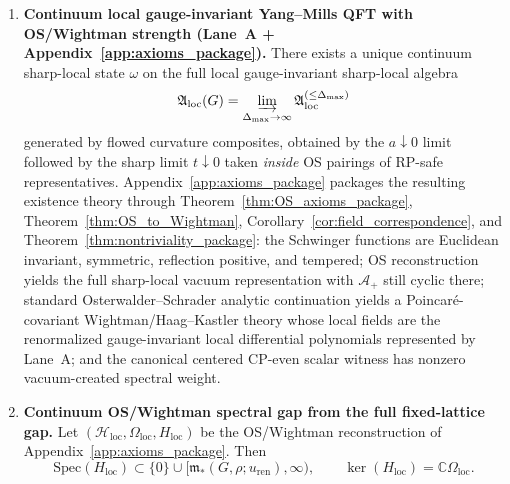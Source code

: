 \begin{theorem}
\begin{enumerate}[label=\textbf{(\Alph*)},leftmargin=2.2em]
\item \textbf{Continuum local gauge-invariant Yang--Mills QFT with OS/Wightman strength (Lane~A + Appendix~\ref{app:axioms_package}).}
There exists a unique continuum sharp-local state $\omega$ on the full local gauge-invariant sharp-local algebra
\[
\mathfrak A_{\mathrm{loc}}(G)=\varinjlim_{\Delta_{\max}\to\infty}\mathfrak A_{\mathrm{loc}}^{(\le \Delta_{\max})}
\]
generated by flowed curvature composites,
obtained by the $a\downarrow0$ limit followed by the sharp limit $t\downarrow0$ taken \emph{inside} OS pairings of RP-safe representatives.
Appendix~\ref{app:axioms_package} packages the resulting existence theory through Theorem~\ref{thm:OS_axioms_package}, Theorem~\ref{thm:OS_to_Wightman}, Corollary~\ref{cor:field_correspondence}, and Theorem~\ref{thm:nontriviality_package}: the Schwinger functions are Euclidean invariant, symmetric, reflection positive, and tempered; OS reconstruction yields the full sharp-local vacuum representation with $\mathcal A_+$ still cyclic there; standard Osterwalder--Schrader analytic continuation yields a Poincar\'e-covariant Wightman/Haag--Kastler theory whose local fields are the renormalized gauge-invariant local differential polynomials represented by Lane~A; and the canonical centered CP-even scalar witness has nonzero vacuum-created spectral weight.

\item \textbf{Continuum OS/Wightman spectral gap from the full fixed-lattice gap.}
Let $(\mathcal H_{\mathrm{loc}},\Omega_{\mathrm{loc}},H_{\mathrm{loc}})$ be the OS/Wightman reconstruction of Appendix~\ref{app:axioms_package}.
Then
\[
\mathrm{Spec}(H_{\mathrm{loc}})\subset\{0\}\cup[\mathfrak m_\ast(G,\rho;u_{\mathrm{ren}}),\infty),
\qquad
\ker(H_{\mathrm{loc}})=\mathbb C\Omega_{\mathrm{loc}}.
\]
\end{enumerate}


\end{theorem}
